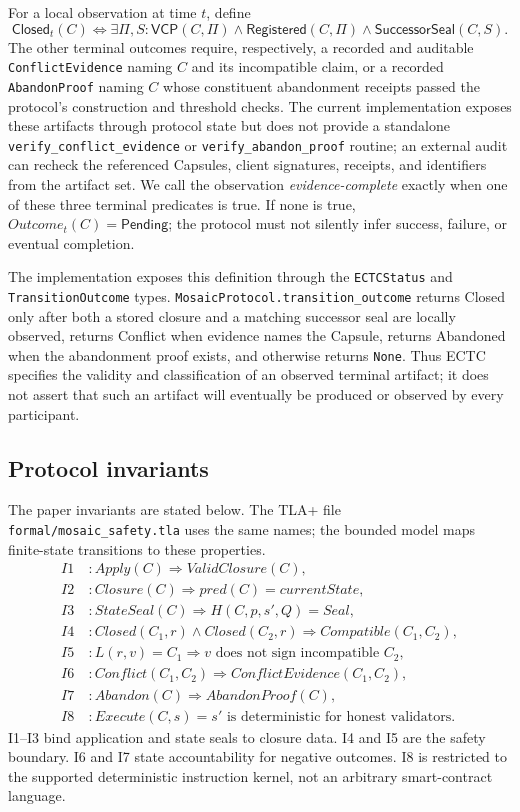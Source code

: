 \documentclass{ledger}
\begin{document}
For a local observation at time $t$, define
\begin{equation}
\mathsf{Closed}_t(C)\Longleftrightarrow\exists\Pi,S:\mathsf{VCP}(C,\Pi)\land\mathsf{Registered}(C,\Pi)\land\mathsf{SuccessorSeal}(C,S).
\end{equation}
The other terminal outcomes require, respectively, a recorded and auditable \texttt{ConflictEvidence} naming $C$ and its incompatible claim, or a recorded \texttt{AbandonProof} naming $C$ whose constituent abandonment receipts passed the protocol's construction and threshold checks. The current implementation exposes these artifacts through protocol state but does not provide a standalone \texttt{verify\_conflict\_evidence} or \texttt{verify\_abandon\_proof} routine; an external audit can recheck the referenced Capsules, client signatures, receipts, and identifiers from the artifact set. We call the observation \emph{evidence-complete} exactly when one of these three terminal predicates is true. If none is true, $Outcome_t(C)=\mathsf{Pending}$; the protocol must not silently infer success, failure, or eventual completion.

The implementation exposes this definition through the \texttt{ECTCStatus} and \texttt{TransitionOutcome} types. \texttt{MosaicProtocol.transition\_outcome} returns Closed only after both a stored closure and a matching successor seal are locally observed, returns Conflict when evidence names the Capsule, returns Abandoned when the abandonment proof exists, and otherwise returns \texttt{None}. Thus ECTC specifies the validity and classification of an observed terminal artifact; it does not assert that such an artifact will eventually be produced or observed by every participant.

\subsection{Protocol invariants}
The paper invariants are stated below. The TLA+ file \texttt{formal/mosaic\_safety.tla} uses the same names; the bounded model maps finite-state transitions to these properties.
\begin{align*}
I1\ &: Apply(C)\Rightarrow ValidClosure(C),\\
I2\ &: Closure(C)\Rightarrow pred(C)=currentState,\\
I3\ &: StateSeal(C)\Rightarrow H(C,p,s',Q)=Seal,\\
I4\ &: Closed(C_1,r)\land Closed(C_2,r)\Rightarrow Compatible(C_1,C_2),\\
I5\ &: L(r,v)=C_1\Rightarrow v\text{ does not sign incompatible }C_2,\\
I6\ &: Conflict(C_1,C_2)\Rightarrow ConflictEvidence(C_1,C_2),\\
I7\ &: Abandon(C)\Rightarrow AbandonProof(C),\\
I8\ &: Execute(C,s)=s'\text{ is deterministic for honest validators.}
\end{align*}
I1--I3 bind application and state seals to closure data. I4 and I5 are the safety boundary. I6 and I7 state accountability for negative outcomes. I8 is restricted to the supported deterministic instruction kernel, not an arbitrary smart-contract language.
\end{document}
